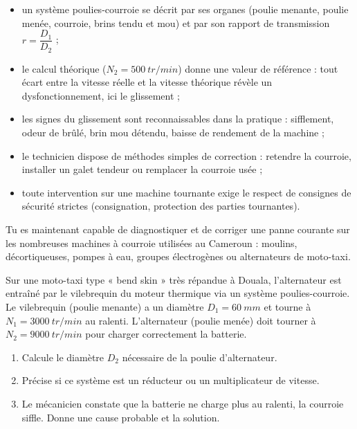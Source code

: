 \documentclass[11pt]{article}
\newcounter{popsec}
\newcounter{popsub}
\newcommand{\courssub}[1]{%
  \stepcounter{popsub}%
  \par\vspace{9pt}\noindent{\popxbold\fontsize{11.5}{13}\selectfont\color{popink}{\color{poporange}\thepopsec.\thepopsub}\hspace{6pt}#1}\par\nopagebreak\vspace{4pt}
}
\begin{document}
\begin{itemize}
\item un système poulies-courroie se décrit par ses organes (poulie menante, poulie menée, courroie, brins tendu et mou) et par son rapport de transmission $r = \dfrac{D_1}{D_2}$ ;
\item le calcul théorique ($N_2 = \SI{500}{tr/min}$) donne une valeur de référence : tout écart entre la vitesse réelle et la vitesse théorique révèle un dysfonctionnement, ici le glissement ;
\item les signes du glissement sont reconnaissables dans la pratique : sifflement, odeur de brûlé, brin mou détendu, baisse de rendement de la machine ;
\item le technicien dispose de méthodes simples de correction : retendre la courroie, installer un galet tendeur ou remplacer la courroie usée ;
\item toute intervention sur une machine tournante exige le respect de consignes de sécurité strictes (consignation, protection des parties tournantes).
\end{itemize}

Tu es maintenant capable de diagnostiquer et de corriger une panne courante sur les nombreuses machines à courroie utilisées au Cameroun : moulins, décortiqueuses, pompes à eau, groupes électrogènes ou alternateurs de moto-taxi.

\courssub{Exercices d'entraînement}

\begin{exercice}
Sur une moto-taxi type « bend skin » très répandue à Douala, l'alternateur est entraîné par le vilebrequin du moteur thermique via un système poulies-courroie. Le vilebrequin (poulie menante) a un diamètre $D_1 = \SI{60}{mm}$ et tourne à $N_1 = \SI{3000}{tr/min}$ au ralenti. L'alternateur (poulie menée) doit tourner à $N_2 = \SI{9000}{tr/min}$ pour charger correctement la batterie.
\begin{enumerate}
\item Calcule le diamètre $D_2$ nécessaire de la poulie d'alternateur.
\item Précise si ce système est un réducteur ou un multiplicateur de vitesse.
\item Le mécanicien constate que la batterie ne charge plus au ralenti, la courroie siffle. Donne une cause probable et la solution.
\end{enumerate}
\end{exercice}
\end{document}
